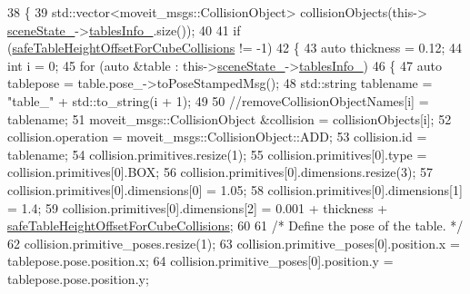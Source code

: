 \begin{DoxyCode}
38         \{
39             std::vector<moveit\_msgs::CollisionObject> collisionObjects(this->
      \hyperlink{classsm__fetch__screw__loop__1_1_1cl__move__group__interface_1_1CpConstraintTableWorkspaces_ae49397b918179c999bd9d4b1c785713f}{sceneState\_}->\hyperlink{classsm__fetch__screw__loop__1_1_1cl__perception__system_1_1CpSceneState_adc87f7a438a7030adfaa9e94f0e8f4e0}{tablesInfo\_}.size());
40 
41             \textcolor{keywordflow}{if} (\hyperlink{classsm__fetch__screw__loop__1_1_1cl__move__group__interface_1_1CpConstraintTableWorkspaces_a63eb3865595f71235002363b5df6c4a0}{safeTableHeightOffsetForCubeCollisions} != -1)
42             \{
43                 \textcolor{keyword}{auto} thickness = 0.12;
44                 \textcolor{keywordtype}{int} i = 0;
45                 \textcolor{keywordflow}{for} (\textcolor{keyword}{auto} &table : this->\hyperlink{classsm__fetch__screw__loop__1_1_1cl__move__group__interface_1_1CpConstraintTableWorkspaces_ae49397b918179c999bd9d4b1c785713f}{sceneState\_}->\hyperlink{classsm__fetch__screw__loop__1_1_1cl__perception__system_1_1CpSceneState_adc87f7a438a7030adfaa9e94f0e8f4e0}{tablesInfo\_})
46                 \{
47                     \textcolor{keyword}{auto} tablepose = table.pose\_->toPoseStampedMsg();
48                     std::string tablename = \textcolor{stringliteral}{"table\_"} + std::to\_string(i + 1);
49 
50                     \textcolor{comment}{//removeCollisionObjectNames[i] = tablename;}
51                     moveit\_msgs::CollisionObject &collision = collisionObjects[i];
52                     collision.operation = moveit\_msgs::CollisionObject::ADD;
53                     collision.id = tablename;
54                     collision.primitives.resize(1);
55                     collision.primitives[0].type = collision.primitives[0].BOX;
56                     collision.primitives[0].dimensions.resize(3);
57                     collision.primitives[0].dimensions[0] = 1.05;
58                     collision.primitives[0].dimensions[1] = 1.4;
59                     collision.primitives[0].dimensions[2] = 0.001 + thickness + 
      \hyperlink{classsm__fetch__screw__loop__1_1_1cl__move__group__interface_1_1CpConstraintTableWorkspaces_a63eb3865595f71235002363b5df6c4a0}{safeTableHeightOffsetForCubeCollisions};
60 
61                     \textcolor{comment}{/* Define the pose of the table. */}
62                     collision.primitive\_poses.resize(1);
63                     collision.primitive\_poses[0].position.x = tablepose.pose.position.x;
64                     collision.primitive\_poses[0].position.y = tablepose.pose.position.y;

\end{DoxyCode}
